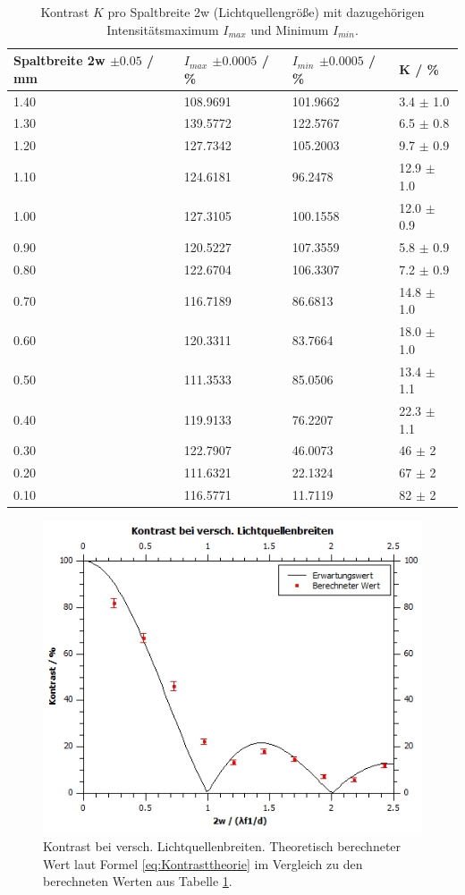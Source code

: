 \documentclass[12pt,a4paper,twoside]{article}
\begin{document}
\begin{table}[H]
    \centering
    \caption{Kontrast $K$ pro Spaltbreite 2w (Lichtquellengröße) mit dazugehörigen Intensitätsmaximum $I_{max}$ und Minimum $I_{min}$.  }
    \label{tab:kontrast}
    \begin{tabular}{| l | l | l | l |}
        \hline
        Spaltbreite 2w $\pm 0.05$ / mm & $I_{max}$ $\pm 0.0005 $ / \% & $I_{min}$ $\pm 0.0005$ / \% & K / \% \\
        \hline
        1.40 & 108.9691 & 101.9662  & 3.4   $\pm$ 1.0   \\
        1.30 & 139.5772 & 122.5767  & 6.5   $\pm$ 0.8   \\
        1.20 & 127.7342 & 105.2003  & 9.7   $\pm$ 0.9   \\
        1.10 & 124.6181 & 96.2478   & 12.9  $\pm$ 1.0   \\
        1.00 & 127.3105 & 100.1558  & 12.0  $\pm$ 0.9   \\
        0.90 & 120.5227 & 107.3559  & 5.8   $\pm$ 0.9   \\
        0.80 & 122.6704 & 106.3307  & 7.2   $\pm$ 0.9   \\
        0.70 & 116.7189 & 86.6813   & 14.8  $\pm$ 1.0   \\
        0.60 & 120.3311 & 83.7664   & 18.0  $\pm$ 1.0   \\
        0.50 & 111.3533 & 85.0506   & 13.4  $\pm$ 1.1   \\
        0.40 & 119.9133 & 76.2207   & 22.3  $\pm$ 1.1   \\
        0.30 & 122.7907 & 46.0073   & 46    $\pm$ 2     \\
        0.20 & 111.6321 & 22.1324   & 67    $\pm$ 2     \\
        0.10 & 116.5771 & 11.7119   & 82    $\pm$ 2     \\
        \hline
    \end{tabular}
\end{table}

\begin{figure}[H]
    \centering
    \includegraphics[width=0.7\linewidth]{nudes/kontrast.jpg}
    \caption{Kontrast bei versch. Lichtquellenbreiten. Theoretisch berechneter Wert laut Formel \ref{eq:Kontrasttheorie} im Vergleich zu den berechneten Werten aus Tabelle \ref{tab:kontrast}. }
    \label{fig:aufgabe 1 kontrast}
\end{figure}
\end{document}
